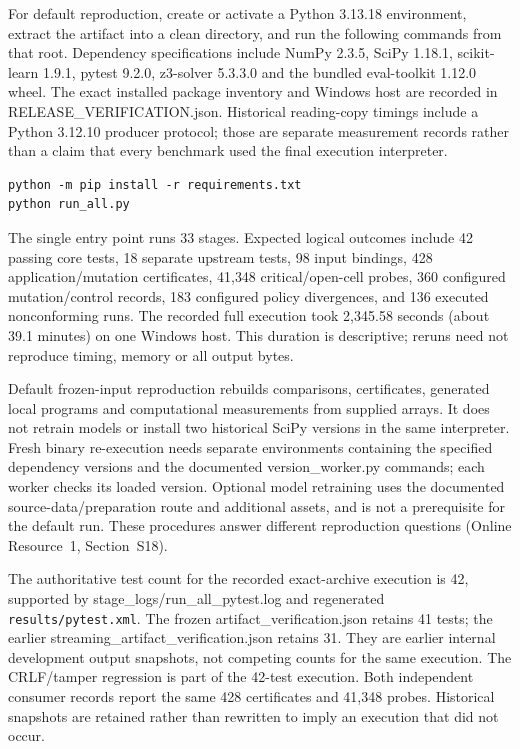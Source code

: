 \documentclass[11pt,a4paper]{article}
\theoremstyle{plain}
\theoremstyle{definition}
\theoremstyle{remark}
\begin{document}
For default reproduction, create or activate a Python 3.13.18 environment, extract the artifact into a clean directory, and run the following commands from that root. Dependency specifications include NumPy 2.3.5, SciPy 1.18.1, scikit-learn 1.9.1, pytest 9.2.0, z3-solver 5.3.3.0 and the bundled eval-toolkit 1.12.0 wheel. The exact installed package inventory and Windows host are recorded in RELEASE\_VERIFICATION.json. Historical reading-copy timings include a Python 3.12.10 producer protocol; those are separate measurement records rather than a claim that every benchmark used the final execution interpreter.

\begin{verbatim}
python -m pip install -r requirements.txt
python run_all.py
\end{verbatim}
The single entry point runs 33 stages. Expected logical outcomes include 42 passing core tests, 18 separate upstream tests, 98 input bindings, 428 application/mutation certificates, 41{,}348 critical/open-cell probes, 360 configured mutation/control records, 183 configured policy divergences, and 136 executed nonconforming runs. The recorded full execution took 2,345.58 seconds (about 39.1 minutes) on one Windows host. This duration is descriptive; reruns need not reproduce timing, memory or all output bytes.

Default frozen-input reproduction rebuilds comparisons, certificates, generated local programs and computational measurements from supplied arrays. It does not retrain models or install two historical SciPy versions in the same interpreter. Fresh binary re-execution needs separate environments containing the specified dependency versions and the documented version\_worker.py commands; each worker checks its loaded version. Optional model retraining uses the documented source-data/preparation route and additional assets, and is not a prerequisite for the default run. These procedures answer different reproduction questions (Online Resource~1, Section~S18).

The authoritative test count for the recorded exact-archive execution is 42, supported by stage\_logs/run\_all\_pytest.log and regenerated \texttt{results/\allowbreak pytest.xml}. The frozen artifact\_verification.json retains 41 tests; the earlier streaming\_artifact\_verification.json retains 31. They are earlier internal development output snapshots, not competing counts for the same execution. The CRLF/tamper regression is part of the 42-test execution. Both independent consumer records report the same 428 certificates and 41{,}348 probes. Historical snapshots are retained rather than rewritten to imply an execution that did not occur.
\end{document}
